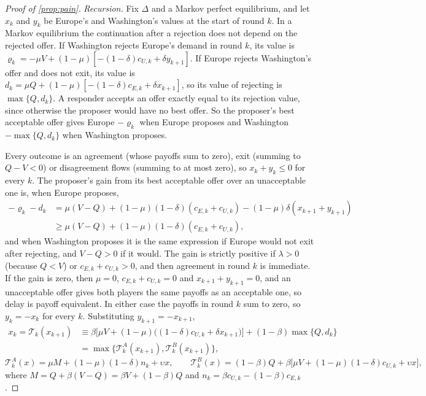 \begin{proof}[Proof of \cref{prop:pain}]
\emph{Recursion.} Fix $\Delta$ and a Markov perfect equilibrium, and let $x_k$ and $y_k$ be Europe's and Washington's values at the start of round $k$. In a Markov equilibrium the continuation after a rejection does not depend on the rejected offer. If Washington rejects Europe's demand in round $k$, its value is $\varrho_k=-\mu V+(1-\mu)[-(1-\delta)c_{U,k}+\delta y_{k+1}]$. If Europe rejects Washington's offer and does not exit, its value is $d_k=\mu Q+(1-\mu)[-(1-\delta)c_{E,k}+\delta x_{k+1}]$, so its value of rejecting is $\max\{Q,d_k\}$. A responder accepts an offer exactly equal to its rejection value, since otherwise the proposer would have no best offer. So the proposer's best acceptable offer gives Europe $-\varrho_k$ when Europe proposes and Washington $-\max\{Q,d_k\}$ when Washington proposes.

Every outcome is an agreement (whose payoffs sum to zero), exit (summing to $Q-V<0$) or disagreement flows (summing to at most zero), so $x_k+y_k\le 0$ for every $k$. The proposer's gain from its best acceptable offer over an unacceptable one is, when Europe proposes,
\begin{align*}
-\varrho_k-d_k&=\mu(V-Q)+(1-\mu)(1-\delta)(c_{E,k}+c_{U,k})-(1-\mu)\delta(x_{k+1}+y_{k+1})\\
&\ge\mu(V-Q)+(1-\mu)(1-\delta)(c_{E,k}+c_{U,k}),
\end{align*}
and when Washington proposes it is the same expression if Europe would not exit after rejecting, and $V-Q>0$ if it would. The gain is strictly positive if $\lambda>0$ (because $Q<V$) or $c_{E,k}+c_{U,k}>0$, and then agreement in round $k$ is immediate. If the gain is zero, then $\mu=0$, $c_{E,k}+c_{U,k}=0$ and $x_{k+1}+y_{k+1}=0$, and an unacceptable offer gives both players the same payoffs as an acceptable one, so delay is payoff equivalent. In either case the payoffs in round $k$ sum to zero, so $y_k=-x_k$ for every $k$. Substituting $y_{k+1}=-x_{k+1}$,
\begin{align*}
x_k=\mathcal T_k(x_{k+1})&\equiv\beta\big[\mu V+(1-\mu)\big((1-\delta)c_{U,k}+\delta x_{k+1}\big)\big]+(1-\beta)\max\{Q,d_k\}\\
&=\max\{\mathcal T^A_k(x_{k+1}),\mathcal T^B_k(x_{k+1})\},
\end{align*}
\[
\mathcal T^A_k(x)=\mu M+(1-\mu)(1-\delta)n_k+\upsilon x,\qquad
\mathcal T^B_k(x)=(1-\beta)Q+\beta\big[\mu V+(1-\mu)(1-\delta)c_{U,k}+\upsilon x\big],
\]
where $M=Q+\beta(V-Q)=\beta V+(1-\beta)Q$ and $n_k=\beta c_{U,k}-(1-\beta)c_{E,k}$.


\end{proof}
